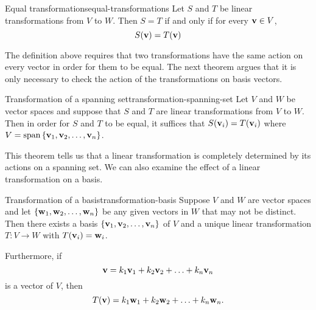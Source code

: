 \begin{definition}{Equal transformations}{equal-transformations}
  Let $S$ and $T$ be linear transformations from $V$ to $W$. Then
  $S = T$ if and only if for every $\mbox{\bf v} \in V$,
  \begin{equation*}
    S (\mbox{\bf v}) = T (\mbox{\bf v})
  \end{equation*}
\end{definition}

The definition above requires that two transformations have the same
action on every vector in order for them to be equal. The next theorem
argues that it is only necessary to check the action of the
transformations on basis vectors.

\begin{theorem}{Transformation of a spanning set}{transformation-spanning-set}
  Let $V$ and $W$ be vector spaces and suppose that $S$ and $T$ are
  linear transformations from $V$ to $W$. Then in order for $S$ and
  $T$ to be equal, it suffices that $S(\mbox{\bf v}_i) = T(\mbox{\bf v}_i)$
  where $V=\sspan \set{\vect{v}_1, \vect{v}_2, \ldots, \vect{v}_n}$.
\end{theorem}

This theorem tells us that a linear transformation is completely
determined by its actions on a spanning set. We can also examine the
effect of a linear transformation on a basis.

\begin{theorem}{Transformation of a basis}{transformation-basis}
  Suppose $V$ and $W$ are vector spaces and let
  $\left\{\mbox{\bf w}_1, \mbox{\bf w}_2, \ldots, \mbox{\bf w}_n\right\}$ be any given
  vectors in $W$ that may not be distinct. Then there exists a basis
  $\left\{\mbox{\bf v}_1, \mbox{\bf v}_2, \ldots, \mbox{\bf v}_n\right\}$ of $V$ and a
  unique linear transformation $T: V \to W$ with
  $T (\mbox{\bf v}_i) = \mbox{\bf w}_i$.

  Furthermore, if
  \begin{equation*}
    \mbox{\bf v} = k_1\mbox{\bf v}_1+k_2\mbox{\bf v}_2+\ldots+ k_n\mbox{\bf v}_n
  \end{equation*}
  is a vector of $V$, then
  \begin{equation*}
    T(\mbox{\bf v}) = k_1\mbox{\bf w}_1+k_2\mbox{\bf w}_2+\ldots+ k_n\mbox{\bf w}_n.
  \end{equation*}
\end{theorem}
